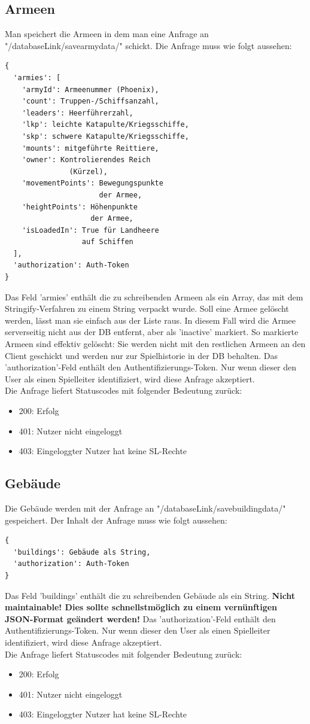 \documentclass[11pt,a4paper,twocolumn]{article}
\begin{document}
\subsection{Armeen}\label{ss:write_armies}
Man speichert die Armeen in dem man eine Anfrage an "/databaseLink/savearmydata/" schickt. Die Anfrage muss wie folgt aussehen:
\begin{lstlisting}
{
  'armies': [
    'armyId': Armeenummer (Phoenix),
	'count': Truppen-/Schiffsanzahl,
    'leaders': Heerführerzahl,
    'lkp': leichte Katapulte/Kriegsschiffe,
    'skp': schwere Katapulte/Kriegsschiffe,
    'mounts': mitgeführte Reittiere,
    'owner': Kontrolierendes Reich 
               (Kürzel),
    'movementPoints': Bewegungspunkte 
                      der Armee,
    'heightPoints': Höhenpunkte 
                    der Armee,
    'isLoadedIn': True für Landheere 
                  auf Schiffen
  ],
  'authorization': Auth-Token
}
\end{lstlisting}
Das Feld 'armies' enthält die zu schreibenden Armeen als ein Array, das mit dem Stringify-Verfahren zu einem String verpackt wurde. Soll eine Armee gelöscht werden, lässt man sie einfach aus der Liste raus. In diesem Fall wird die Armee serverseitig nicht aus der DB entfernt, aber als 'inactive' markiert. So markierte Armeen sind effektiv gelöscht: Sie werden nicht mit den restlichen Armeen an den Client geschickt und werden nur zur Spielhistorie in der DB behalten. Das 'authorization'-Feld enthält den Authentifizierungs-Token. Nur wenn dieser den User als einen Spielleiter identifiziert, wird diese Anfrage akzeptiert.\\
Die Anfrage liefert Statuscodes mit folgender Bedeutung zurück:
\begin{itemize}
\item 200: Erfolg
\item 401: Nutzer nicht eingeloggt
\item 403: Eingeloggter Nutzer hat keine SL-Rechte
\end{itemize}
\subsection{Gebäude}\label{ss:write_buildings}
Die Gebäude werden mit der Anfrage an "/databaseLink/savebuildingdata/" gespeichert. Der Inhalt der Anfrage muss wie folgt aussehen:
\begin{lstlisting}
{
  'buildings': Gebäude als String,
  'authorization': Auth-Token
}
\end{lstlisting}
Das Feld 'buildings' enthält die zu schreibenden Gebäude als ein String. \textbf{ Nicht maintainable! Dies sollte schnellstmöglich zu einem vernünftigen JSON-Format geändert werden!} Das 'authorization'-Feld enthält den Authentifizierungs-Token. Nur wenn dieser den User als einen Spielleiter identifiziert, wird diese Anfrage akzeptiert.\\
Die Anfrage liefert Statuscodes mit folgender Bedeutung zurück:
\begin{itemize}
\item 200: Erfolg
\item 401: Nutzer nicht eingeloggt
\item 403: Eingeloggter Nutzer hat keine SL-Rechte
\end{itemize}
\end{document}
